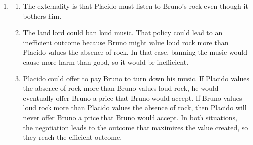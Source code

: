 \documentclass{article}
\begin{document}
\begin{enumerate}
\begin{enumerate}
	\item The social cost of each bottle is now \$2.50. That means total surplus per person is 
		\[TS = 5 - 2.5 + 4 - 2.5 + 3 - 2.5 + 2 - 2.5 = 4. \]
		
	\item The welfare that Cindy generates increases to 
		\[ TS = 5 - 2.5 + 4 - 2.5 + 3 - 2.5 = 4.5. \]
		As a result, total surplus in Whoville increases by 0.5.
		
	\item Now the private cost of each bottle is \$2.50. That means each Whovillian will only consume three bottles. 
		\begin{align*}
		CS &= 5 - 2.5 + 4 - 2.5 + 3 - 2.5 = 4.5 \\
		External \ Cost &= 3(1) = 3 \\
		Government \ Revenue &= 3(1) = 3 \\
		TS &= CS - External \ Cost + Gov't \ Revenue \\
		&= 4.5 - 3 + 3 = 4.5
		\end{align*}
		
	\item I would support the mayor's policy. It increases total surplus per person.
	
	\end{enumerate}
	
\item

	\begin{enumerate}
	
	\item The externality is that Placido must listen to Bruno's rock even though it bothers him.
	
	\item The land lord could ban loud music. That policy could lead to an inefficient outcome because Bruno might value loud rock more than Placido values the absence of rock. In that case, banning the music would cause more harm than good, so it would be inefficient. 
	
	\item Placido could offer to pay Bruno to turn down his music. If Placido values the absence of rock more than Bruno values loud rock, he would eventually offer Bruno a price that Bruno would accept. If Bruno values loud rock more than Placido values the absence of rock, then Placido will never offer Bruno a price that Bruno would accept. In both situations, the negotiation leads to the outcome that maximizes the value created, so they reach the efficient outcome.
	

\end{enumerate}
\end{enumerate}
\end{document}
